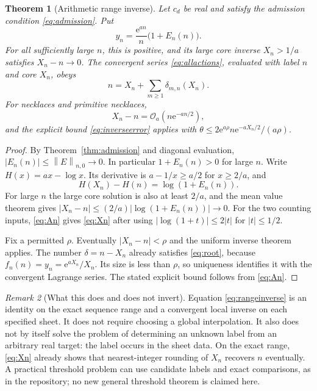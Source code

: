 \documentclass[11pt,a4paper]{article}
\numberwithin{equation}{section}
\newtheorem{theorem}{Theorem}[section]
\theoremstyle{definition}
\theoremstyle{remark}
\newtheorem{remark}[theorem]{Remark}
\newcommand{\ee}{\mathrm e}
\newcommand{\bigO}{\mathcal O}
\newcommand{\norm}[1]{\left\|#1\right\|}
\begin{document}
\begin{theorem}[Arithmetic range inverse]\label{thm:range}
Let $c_d$ be real and satisfy the admission condition
\eqref{eq:admission}. Put
\begin{equation}
 y_n=\frac{\ee^{an}}n\bigl(1+E_n(n)\bigr).
 \label{eq:yn}
\end{equation}
For all sufficiently large $n$, this is positive, and its large core
inverse $X_n>1/a$ satisfies $X_n-n\to0$. The convergent series
\eqref{eq:allactions}, evaluated with label $n$ and core $X_n$, obeys
\begin{equation}
 n=X_n+\sum_{m\ge1}\delta_{m,n}(X_n).
 \label{eq:rangeinverse}
\end{equation}
For necklaces and primitive necklaces,
\begin{equation}
 X_n-n=\bigO_a\!\left(n\ee^{-an/2}\right),
 \label{eq:Xn}
\end{equation}
and the explicit bound \eqref{eq:inverseerror} applies with
$\theta\le 2\ee^{a\rho}n\ee^{-aX_n/2}/(a\rho)$.
\end{theorem}
\begin{proof}
By Theorem~\ref{thm:admission} and diagonal evaluation,
$|E_n(n)|\le\norm{E}_{n,0}\to0$. In particular $1+E_n(n)>0$
for large $n$. Write $H(x)=ax-\log x$. Its derivative is
$a-1/x\ge a/2$ for $x\ge2/a$, and
\[
 H(X_n)-H(n)=\log(1+E_n(n)).
\]
For large $n$ the large core solution is also at least $2/a$, and the
mean value theorem gives
$|X_n-n|\le(2/a)|\log(1+E_n(n))|\to0$.
For the two counting inputs, \eqref{eq:An} gives
\eqref{eq:Xn} after using $|\log(1+t)|\le2|t|$ for $|t|\le1/2$.

Fix a permitted $\rho$. Eventually $|X_n-n|<\rho$ and the uniform
inverse theorem applies. The number $\delta=n-X_n$ already satisfies
\eqref{eq:root}, because $f_n(n)=y_n=\ee^{aX_n}/X_n$. Its size is
less than $\rho$, so uniqueness identifies it with the convergent
Lagrange series. The stated explicit bound follows from
\eqref{eq:An}.
\end{proof}

\begin{remark}[What this does and does not invert]
Equation \eqref{eq:rangeinverse} is an identity on the exact sequence
range and a convergent local inverse on each specified sheet. It does
not require choosing a global interpolation. It also does not by itself
solve the problem of determining an unknown label from an arbitrary
real target: the label occurs in the sheet data. On the exact range,
\eqref{eq:Xn} already shows that nearest-integer rounding of $X_n$
recovers $n$ eventually. A practical threshold problem can use candidate
labels and exact comparisons, as in the repository; no new general
threshold theorem is claimed here.
\end{remark}
\end{document}
